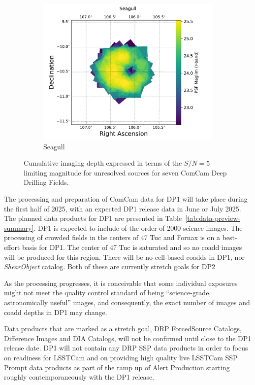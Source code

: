 \begin{figure}[htbp]
    \hfill
    \begin{subfigure}[b]{0.3\textwidth}
        \centering
        \includegraphics[width=\textwidth]{figures/comcam_psf_maglim_seagull_r}
        \caption{Seagull}
        \label{fig:img8}
    \end{subfigure}
     \caption{Cumulative imaging depth expressed in terms of the $S/N=5$ limiting magnitude for unresolved sources for seven ComCam Deep Drilling Fields.}
     \label{fig:dp1_fields_psf_maglim}
\end{figure}

The  processing and preparation of ComCam data for DP1 will take place during the first half of 2025, with an expected DP1 release data in June or July 2025. 
The planned data products for DP1 are presented in Table~\ref{tab:data-preview-summary}.
DP1 is expected to include of the order of 2000 science images.
The processing of crowded fields in the centers of 47 Tuc and Fornax is on a best-effort basis for DP1.
The center of 47 Tuc is saturated and so no coadd images will be produced for this region.
There will be no cell-based coadds in DP1, nor \textit{ShearObject} catalog.
Both of these are currently stretch goals for DP2

As the processing progresses, it is conceivable that some individual exposures might not meet the quality control standard of being “science-grade, astronomically useful” images, and consequently, the exact number of images  and coadd depths in DP1 may change.

Data products that are marked as a stretch goal, DRP ForcedSource Catalogs, Difference Images and DIA Catalogs,  will not be confirmed until close to the DP1 release date.
DP1 will not contain any DRP  SSP data products in order to focus on readiness for LSSTCam and on providing high quality live LSSTCam SSP Prompt data products as part of the ramp up of Alert Production starting roughly contemporaneously with the DP1 release.


